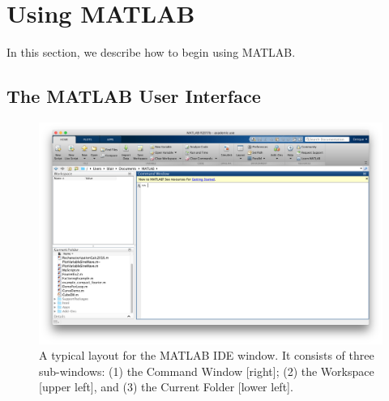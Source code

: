 \section{Using MATLAB}

In this section, we describe how to begin using MATLAB.

\subsection{The MATLAB User Interface}

\begin{figure}[htbp] %
   \centering
   \includegraphics[width=1\textwidth]{graphics/MATLAB_Main_Window.png} 
   \caption{A typical layout for the MATLAB IDE window. It consists of three sub-windows: (1) the Command Window [right]; (2) the Workspace [upper left], and (3) the Current Folder [lower left].}
   \label{fig:MATLAB_IDE}
\end{figure}

